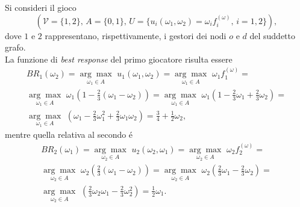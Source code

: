 \documentclass[11pt,largemargins]{homework}
\begin{document}
\begin{alphaparts}
    \questionpart
    Si consideri il gioco
    \begin{equation*}
    \left(\mathcal{V}=\{1,2\}, \, A=\{0,1\},\, U=\{u_{i}\left(\omega_{1},\omega_{2}\right)=\omega_{i}f_{i}^{(\omega)}, \, i=1,2\}\right),
    \end{equation*}
    dove $1$ e $2$ rappresentano, rispettivamente, i gestori dei nodi $o$ e $d$ del suddetto grafo.\\
    La funzione di \emph{best response} del primo giocatore risulta essere
    \begin{gather*}
    BR_{1}\left(\omega_{2}\right)=\underset{\omega_{1}\in A}{\arg\max} \, \, u_{1}\left(\omega_{1},\omega_{2}\right)= \underset{\omega_{1}\in A}{\arg\max} \, \, \omega_{1}f_{1}^{(\omega)}=\\ 
    \underset{\omega_{1}\in A}{\arg\max} \, \, \omega_{1}\left(1-\frac{2}{3}\left(\omega_{1}-\omega_{2}\right)\right)=
 \underset{\omega_{1}\in A}{\arg\max} \, \, \omega_{1}\left(1-\frac{2}{3}\omega_{1}+\frac{2}{3}\omega_{2}\right)=\\ \underset{\omega_{1}\in A}{\arg\max} \, \, \left(\omega_{1}-\frac{2}{3}\omega_{1}^{2}+\frac{2}{3}\omega_{1}\omega_{2}\right)=\frac{3}{4}+\frac{1}{2}\omega_{2},  
    \end{gather*}
    mentre quella relativa al secondo é
    \begin{gather*}
     BR_{2}\left(\omega_{1}\right)=\underset{\omega_{2}\in A}{\arg\max} \, \, u_{2}\left(\omega_{2},\omega_{1}\right)= \underset{\omega_{2}\in A}{\arg\max} \, \, \omega_{2}f_{2}^{(\omega)}= \\
     \underset{\omega_{2}\in A}{\arg\max} \, \, \omega_{2}\left(\frac{2}{3}\left(\omega_{1}-\omega_{2}\right)\right)=
 \underset{\omega_{2}\in A}{\arg\max} \, \, \omega_{2}\left(\frac{2}{3}\omega_{1}-\frac{2}{3}\omega_{2}\right)=\\
 \underset{\omega_{2}\in A}{\arg\max} \, \, \left(\frac{2}{3}\omega_{2}\omega_{1}-\frac{2}{3}\omega_{2}^{2}\right)=\frac{1}{2}\omega_{1}.
    \end{gather*}
    



\end{alphaparts}
\end{document}
